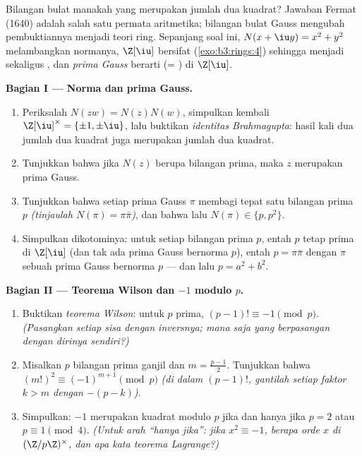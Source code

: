 \begin{problem}\label{pb:b3:rings:1}
Bilangan bulat manakah yang merupakan jumlah dua kuadrat? Jawaban Fermat (1640) adalah
salah satu permata aritmetika; bilangan bulat Gauss mengubah pembuktiannya
menjadi teori ring. Sepanjang soal ini, $N(x + \iu y) = x^2 + y^2$ melambangkan
normanya, $\Z[\iu]$ bersifat  (\cref{exo:b3:rings:4}) sehingga
menjadi  sekaligus , dan \emph{prima Gauss} berarti  (=
) di $\Z[\iu]$.

\medskip
\noindent\textbf{Bagian I --- Norma dan prima Gauss.}
\begin{enumerate}
  \item Periksalah $N(zw) = N(z)N(w)$, simpulkan kembali $\Z[\iu]^\times =
        \{\pm1, \pm\iu\}$, lalu buktikan \emph{identitas
        Brahmagupta}: hasil kali dua jumlah dua kuadrat juga merupakan jumlah
        dua kuadrat.
  \item Tunjukkan bahwa jika $N(z)$ berupa bilangan prima, maka $z$ merupakan
        prima Gauss.
  \item Tunjukkan bahwa setiap prima Gauss $\pi$ membagi tepat satu
        bilangan prima $p$ \emph{(tinjaulah $N(\pi) = \pi\bar\pi$)},
        dan bahwa lalu $N(\pi) \in \{p, p^2\}$.
  \item Simpulkan dikotominya: untuk setiap bilangan prima $p$, entah $p$
        tetap prima di $\Z[\iu]$ (dan tak ada prima Gauss bernorma
        $p$), entah $p = \pi\bar\pi$ dengan $\pi$ sebuah prima
        Gauss bernorma $p$ --- dan lalu $p = a^2 + b^2$.
\end{enumerate}

\medskip
\noindent\textbf{Bagian II --- Teorema Wilson dan $-1$ modulo
$p$.}
\begin{enumerate}[resume]
  \item Buktikan \emph{teorema Wilson}: untuk $p$ prima, $(p-1)!
        \equiv -1 \pmod p$. \emph{(Pasangkan setiap sisa dengan
        inversnya; mana saja yang berpasangan dengan dirinya sendiri?)}
  \item Misalkan $p$ bilangan prima ganjil dan $m = \frac{p-1}2$. Tunjukkan bahwa
        $(m!)^2 \equiv (-1)^{m+1} \pmod p$ \emph{(di dalam $(p-1)!$,
        gantilah setiap faktor $k > m$ dengan $-(p - k)$)}.
  \item Simpulkan: $-1$ merupakan kuadrat modulo $p$ jika dan hanya jika $p = 2$ atau $p
        \equiv 1 \pmod 4$. \emph{(Untuk arah ``hanya jika'': jika $x^2
        \equiv -1$, berapa orde $x$ di $(\Z/p\Z)^\times$,
        dan apa kata teorema Lagrange?)}
\end{enumerate}


\end{problem}
